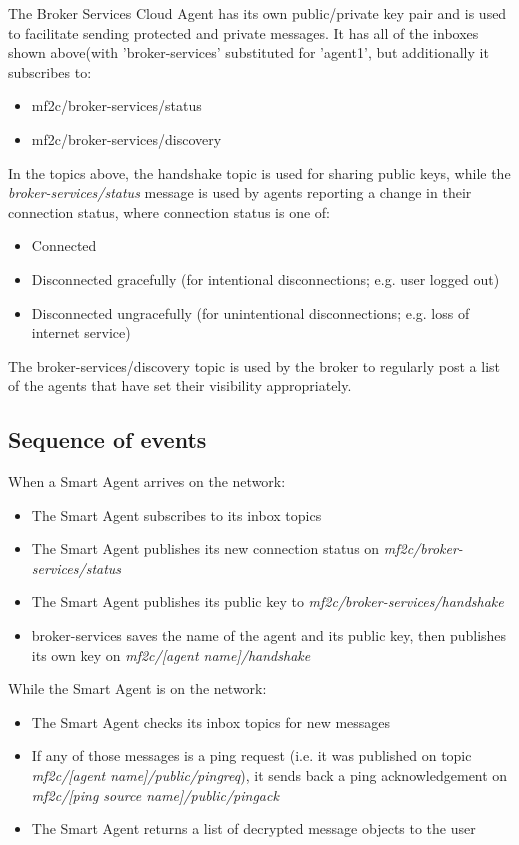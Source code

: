 The Broker Services Cloud Agent has its own public/private key pair and is used to facilitate sending protected and private messages. It has all of the inboxes shown above(with 'broker-services' substituted for 'agent1', but additionally it subscribes to:

\begin{itemize}
    \item mf2c/broker-services/status
    \item mf2c/broker-services/discovery
\end{itemize}


In the topics above, the handshake topic is used for sharing public keys, while the \textit{broker-services/status} message is used by agents reporting a change in their connection status, where connection status is one of:
\begin{itemize}
    \item Connected
    \item Disconnected gracefully (for intentional disconnections; e.g. user logged out)
    \item Disconnected ungracefully (for unintentional disconnections; e.g. loss of internet service)
\end{itemize}

The broker-services/discovery topic is used by the broker to regularly post a list of the agents that have set their visibility appropriately. 

\subsection{Sequence of events}

When a Smart Agent arrives on the network:
\begin{itemize}
    \item The Smart Agent subscribes to its inbox topics
    \item The Smart Agent publishes its new connection status on \textit{mf2c/broker-services/status}
    \item The Smart Agent publishes its public key to \textit{mf2c/broker-services/handshake}
    \item broker-services saves the name of the agent and its public key, then publishes its own key on \textit{mf2c/[agent name]/handshake}
\end{itemize}

While the Smart Agent is on the network:
\begin{itemize}
    \item The Smart Agent checks its inbox topics for new messages
    \item If any of those messages is a ping request (i.e. it was published on topic \textit{mf2c/[agent name]/public/pingreq}), it sends back a ping acknowledgement on \textit{mf2c/[ping source name]/public/pingack}
    \item The Smart Agent returns a list of decrypted message objects to the user
\end{itemize}

